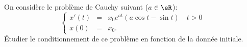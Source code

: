 
\begin{exercice}\label{exoSerieTrois0002}

	On considère le problème de Cauchy suivant ($a\in\eR$):
	\begin{equation}
		\left\{
			\begin{array}{ccc}
				x'(t)&=&x_0e^{at}(a\cos t-\sin t)\quad t>0\\
				x(0)&=&x_0.
			\end{array}
		\right.
	\end{equation}
	Étudier le conditionnement de ce problème en fonction de la donnée initiale.

\end{exercice}
